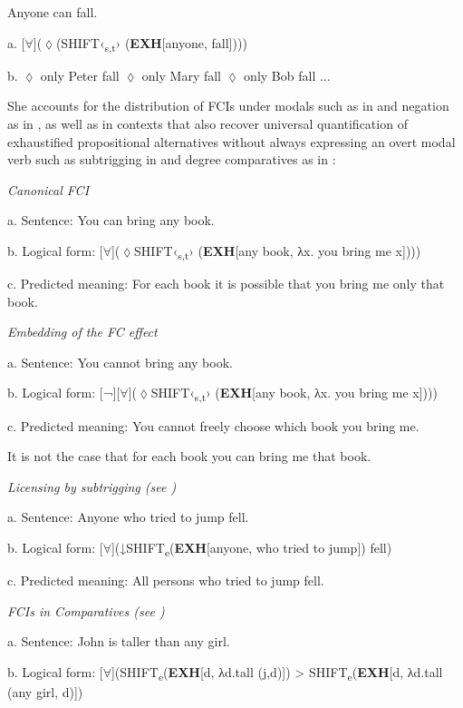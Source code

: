 \documentclass[output=paper]{langscibook}
\begin{document}
\label{bkm:Ref150778689}  Anyone can fall. \citep{AloniEtAl2011}

  a.  [${\forall}$](${\lozenge}$(\textsc{SHIFT}‹\textsubscript{s,t}›\textsubscript{} (\textbf{EXH}[anyone, fall])))

  b.  ${\lozenge}$ only Peter fall  ${\lozenge}$ only Mary fall  ${\lozenge}$ only Bob fall  ...

    \citep{AloniEtAl2011}

She accounts for the distribution of FCIs under modals such as in  and negation as in , as well as in contexts that also recover universal quantification of exhaustified propositional alternatives without always expressing an overt modal verb such as subtrigging in  and degree comparatives as in :

\label{bkm:Ref63544535}  \textit{Canonical FCI}

  a.  Sentence: You can bring any book.

  b.  Logical form: [${\forall}$](${\lozenge}$\textsc{SHIFT}‹\textsubscript{s,t}› (\textbf{EXH}[any book, λx. you bring me x])))

  c.  Predicted meaning: For each book it is possible that you bring me only that book.

\label{bkm:Ref63544537}  \textit{Embedding of the FC effect}

  a.  Sentence: You cannot bring any book.

  b.  Logical form: [¬][${\forall}$](${\lozenge}$\textsc{SHIFT}‹\textsubscript{s,t}› (\textbf{EXH}[any book, λx. you bring me x])))

  c.  Predicted meaning: You cannot freely choose which book you bring me.

It is not the case that for each book you can bring me that book.

\label{bkm:Ref54857683}  \textit{Licensing by subtrigging (see \citealt{Aloni2007})}

  a.  Sentence: Anyone who tried to jump fell.

  b.  Logical form: [${\forall}$](↓\textsc{SHIFT}\textsubscript{e}(\textbf{EXH}[anyone, who tried to jump]) fell)

  c.  Predicted meaning: All persons who tried to jump fell.

\label{bkm:Ref54857674}  \textit{FCIs in Comparatives (see \citealt{Aloni2021})}

  a.  Sentence: John is taller than any girl.

  b.  Logical form: [${\forall}$](\textsc{SHIFT}\textsubscript{e}(\textbf{EXH}[d, λd.tall (j,d)]) > \textsc{SHIFT}\textsubscript{e}(\textbf{EXH}[d, λd.tall (any girl, d)])
\end{document}
